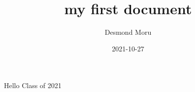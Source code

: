 \documentclass{article}
\title{my first document}
\date{2021-10-27}
\author{Desmond Moru}
\begin{document}
	\maketitle
	\newpage
	Hello Class of 2021
\end{document}
